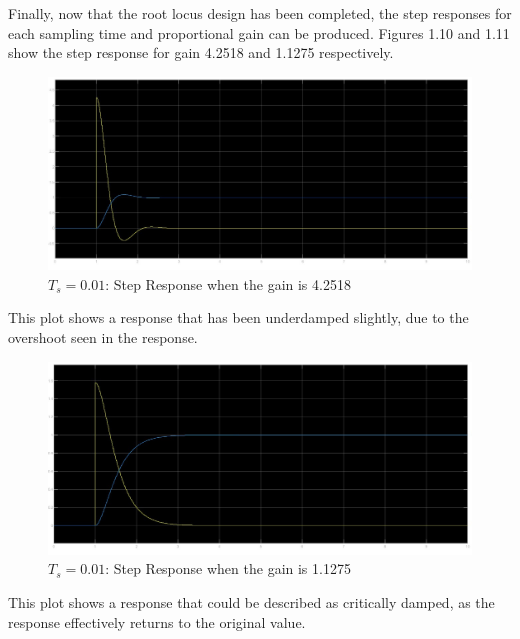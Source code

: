 \documentclass[stu, a4paper, 12pt, floatsintext]{apa7}
\numberwithin{figure}{section}
\numberwithin{table}{section}
\numberwithin{equation}{section}
\begin{document}
Finally, now that the root locus design has been completed, the step responses for each sampling time and proportional gain can be produced. Figures 1.10 and 1.11 show the step response for gain 4.2518 and 1.1275 respectively. 
\begin{figure}[H]
    \caption{$T_s = 0.01$: Step Response when the gain is 4.2518}
    \label{fig:0.01_Ts_step_response_1}
    \centering
    \includegraphics[width=1.1\textwidth]{pictures/task2_0.01_step_response_1.jpg}
\end{figure}
This plot shows a response that has been underdamped slightly, due to the overshoot seen in the response.
\begin{figure}[H]
    \caption{$T_s = 0.01$: Step Response when the gain is 1.1275}
    \label{fig:0.01_Ts_step_response_2}
    \centering
    \includegraphics[width=1.1\textwidth]{pictures/task2_0.01_step_response_2.jpg}
\end{figure}
This plot shows a response that could be described as critically damped, as the response effectively returns to the original value. 
\end{document}
